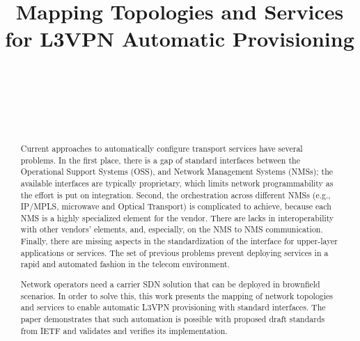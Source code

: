 \documentclass[conference]{IEEEtran}
\begin{document}
\title{Mapping Topologies and Services for L3VPN Automatic Provisioning}

\author{
\\
\and
{}
\\
\and
{}
\\
}
\maketitle
\begin{abstract}
Current approaches to automatically configure transport services have several problems.  In the first place, there is a gap of standard interfaces between the Operational Support Systems (OSS), and Network Management Systems (NMSs); the available interfaces are typically proprietary, which limits network programmability as the effort is put on integration. 
Second, the orchestration across different NMSs (e.g., IP/MPLS, microwave and Optical Transport) is complicated to achieve, because each NMS is a highly specialized element for the vendor. 
There are lacks in interoperability with other vendors’ elements, and, especially, on the NMS to NMS communication. 
Finally, there are missing aspects in the standardization of the interface for upper-layer applications or services. The set of previous problems prevent deploying services in a rapid and automated fashion in the telecom environment. 

Network operators need a carrier SDN solution that can be deployed in brownfield scenarios. In order to solve this, this work presents the mapping of network topologies and services to enable automatic L3VPN provisioning with standard interfaces. The paper demonstrates that such automation is possible with proposed draft standards from IETF and validates and verifies its implementation.
\end{abstract}
\end{document}
